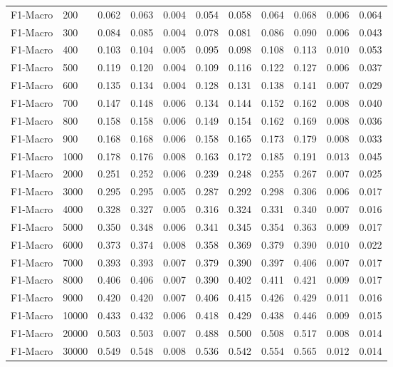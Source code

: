 \begin{table}[htbp]
\begin{table}
\begin{tabular}{ll|rrrrrrr|rr}
F1-Macro & 200 & 0.062 & 0.063 & 0.004 & 0.054 & 0.058 & 0.064 & 0.068 & 0.006 & 0.064 \\
F1-Macro & 300 & 0.084 & 0.085 & 0.004 & 0.078 & 0.081 & 0.086 & 0.090 & 0.006 & 0.043 \\
F1-Macro & 400 & 0.103 & 0.104 & 0.005 & 0.095 & 0.098 & 0.108 & 0.113 & 0.010 & 0.053 \\
F1-Macro & 500 & 0.119 & 0.120 & 0.004 & 0.109 & 0.116 & 0.122 & 0.127 & 0.006 & 0.037 \\
F1-Macro & 600 & 0.135 & 0.134 & 0.004 & 0.128 & 0.131 & 0.138 & 0.141 & 0.007 & 0.029 \\
F1-Macro & 700 & 0.147 & 0.148 & 0.006 & 0.134 & 0.144 & 0.152 & 0.162 & 0.008 & 0.040 \\
F1-Macro & 800 & 0.158 & 0.158 & 0.006 & 0.149 & 0.154 & 0.162 & 0.169 & 0.008 & 0.036 \\
F1-Macro & 900 & 0.168 & 0.168 & 0.006 & 0.158 & 0.165 & 0.173 & 0.179 & 0.008 & 0.033 \\
F1-Macro & 1000 & 0.178 & 0.176 & 0.008 & 0.163 & 0.172 & 0.185 & 0.191 & 0.013 & 0.045 \\
F1-Macro & 2000 & 0.251 & 0.252 & 0.006 & 0.239 & 0.248 & 0.255 & 0.267 & 0.007 & 0.025 \\
F1-Macro & 3000 & 0.295 & 0.295 & 0.005 & 0.287 & 0.292 & 0.298 & 0.306 & 0.006 & 0.017 \\
F1-Macro & 4000 & 0.328 & 0.327 & 0.005 & 0.316 & 0.324 & 0.331 & 0.340 & 0.007 & 0.016 \\
F1-Macro & 5000 & 0.350 & 0.348 & 0.006 & 0.341 & 0.345 & 0.354 & 0.363 & 0.009 & 0.017 \\
F1-Macro & 6000 & 0.373 & 0.374 & 0.008 & 0.358 & 0.369 & 0.379 & 0.390 & 0.010 & 0.022 \\
F1-Macro & 7000 & 0.393 & 0.393 & 0.007 & 0.379 & 0.390 & 0.397 & 0.406 & 0.007 & 0.017 \\
F1-Macro & 8000 & 0.406 & 0.406 & 0.007 & 0.390 & 0.402 & 0.411 & 0.421 & 0.009 & 0.017 \\
F1-Macro & 9000 & 0.420 & 0.420 & 0.007 & 0.406 & 0.415 & 0.426 & 0.429 & 0.011 & 0.016 \\
F1-Macro & 10000 & 0.433 & 0.432 & 0.006 & 0.418 & 0.429 & 0.438 & 0.446 & 0.009 & 0.015 \\
F1-Macro & 20000 & 0.503 & 0.503 & 0.007 & 0.488 & 0.500 & 0.508 & 0.517 & 0.008 & 0.014 \\
F1-Macro & 30000 & 0.549 & 0.548 & 0.008 & 0.536 & 0.542 & 0.554 & 0.565 & 0.012 & 0.014 \\

\end{tabular}
\end{table}
\end{table}
